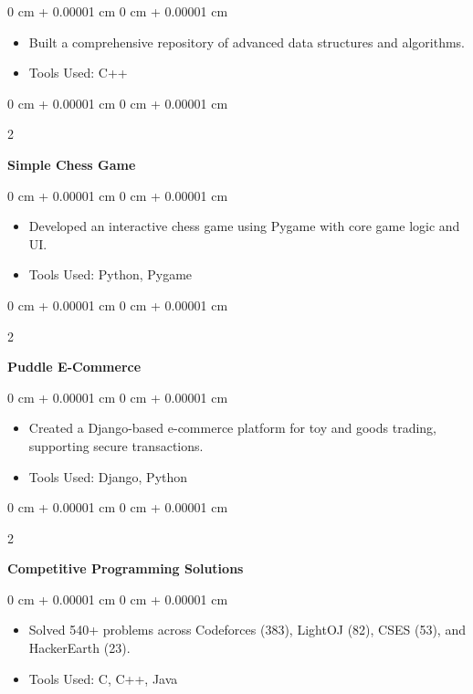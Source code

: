 \documentclass[10pt, letterpaper]{article}
\newenvironment{highlights}{
	\begin{itemize}[
		topsep=0.10 cm,
		parsep=0.10 cm,
		partopsep=0pt,
		itemsep=0pt,
		leftmargin=0 cm + 10pt
		]
	}{
	\end{itemize}
} %
\newenvironment{onecolentry}{
	\begin{adjustwidth}{
			0 cm + 0.00001 cm
		}{
			0 cm + 0.00001 cm
		}
	}{
	\end{adjustwidth}
} %
\newenvironment{twocolentry}[2][]{
	\onecolentry
	\def\secondColumn{#2}
	\setcolumnwidth{\fill, 4.5 cm}
	\begin{paracol}{2}
	}{
		\switchcolumn \raggedleft \secondColumn
	\end{paracol}
	\endonecolentry
} %
\begin{document}
	\vspace{0.10 cm}
	\begin{onecolentry}
		\begin{highlights}
			\item Built a comprehensive repository of advanced data structures and algorithms.
			\item Tools Used: C++
		\end{highlights}
	\end{onecolentry}
	
	
	\vspace{0.2 cm}
	
	\begin{twocolentry}{
			\href{https://github.com/sudiptarathi2020/Simple-Chess-Game}{{\faGithub}}
		}
		\textbf{Simple Chess Game}\end{twocolentry}
	
	\vspace{0.10 cm}
	\begin{onecolentry}
		\begin{highlights}
			\item Developed an interactive chess game using Pygame with core game logic and UI.
			\item Tools Used: Python, Pygame
		\end{highlights}
	\end{onecolentry}

	\vspace{0.2cm}
	\begin{twocolentry}{
			\href{https://github.com/sudiptarathi2020/puddle}{{\faGithub}}
		}
		\textbf{Puddle E-Commerce}\end{twocolentry}
	\vspace{0.10cm}
	\begin{onecolentry}
		\begin{highlights}
			\item Created a Django-based e-commerce platform for toy and goods trading, supporting secure transactions.
			\item Tools Used: Django, Python
		\end{highlights}
	\end{onecolentry}

	\vspace{0.2cm}
	\begin{twocolentry}
		{
			\href{https://github.com/sudiptarathi2020/puddle}{{\faGithub}}
		}
		
		\textbf{Competitive Programming Solutions}
	\end{twocolentry}
	\vspace{0.10cm}
	\begin{onecolentry}
		\begin{highlights}
			\item Solved 540+ problems across Codeforces (383), LightOJ (82), CSES (53), and HackerEarth (23).
			\item Tools Used: C, C++, Java
		\end{highlights}
	\end{onecolentry}
\end{document}
